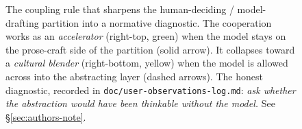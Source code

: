 \begin{figure}[!t]
\caption{The coupling rule that sharpens the human-deciding /
model-drafting partition into a normative diagnostic. The cooperation
works as an \emph{accelerator} (right-top, green) when the model
stays on the prose-craft side of the partition (solid arrow). It
collapses toward a \emph{cultural blender} (right-bottom, yellow)
when the model is allowed across into the abstracting layer (dashed
arrows). The honest diagnostic, recorded in
\texttt{doc/user-observations-log.md}: \emph{ask whether the
abstraction would have been thinkable without the model.} See
\S\ref{sec:authors-note}.}
\label{fig:coupling-rule}
\end{figure}
